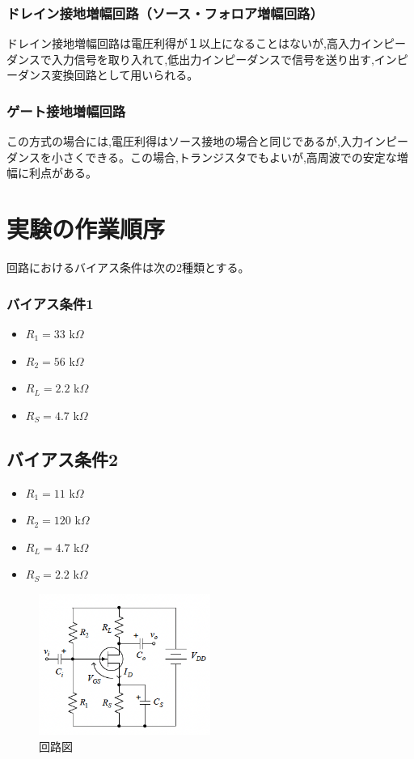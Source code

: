 \documentclass[a4paper,11pt,xelatex,ja=standard]{bxjsarticle}
\begin{document}
        \subsubsection{ドレイン接地増幅回路（ソース・フォロア増幅回路）}
            ドレイン接地増幅回路は電圧利得が１以上になることはないが,高入力インピーダンスで入力信号を取り入れて,低出力インピーダンスで信号を送り出す,インピーダンス変換回路として用いられる。
        \subsubsection{ゲート接地増幅回路}
            この方式の場合には,電圧利得はソース接地の場合と同じであるが,入力インピーダンスを小さくできる。この場合,トランジスタでもよいが,高周波での安定な増幅に利点がある。
    
\section{実験の作業順序}
    回路におけるバイアス条件は次の2種類とする。

    \subsubsection*{バイアス条件1}
    \begin{itemize}
        \item $R_1 = 33$ k$\Omega$
        \item $R_2 = 56$ k$\Omega$
        \item $R_L = 2.2$ k$\Omega$
        \item $R_S = 4.7$ k$\Omega$
    \end{itemize}

    
    \subsection*{バイアス条件2}
    \begin{itemize}
        \item $R_1 = 11$ k$\Omega$
        \item $R_2 = 120$ k$\Omega$
        \item $R_L = 4.7$ k$\Omega$
        \item $R_S = 2.2$ k$\Omega$
    \end{itemize}
    
    \begin{figure}[H]
        \centering
        \includegraphics[width=0.5\textwidth]{./img/4/pic-1.png}
        \caption{回路図}
    \end{figure}
\end{document}
